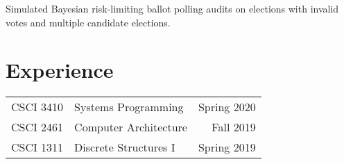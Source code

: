 \documentclass[]{deedy-resume-openfont}
\begin{document}
\begin{minipage}[t]{0.66\textwidth}
        \sectionsep
        Simulated Bayesian risk-limiting ballot polling audits on elections with invalid votes and multiple candidate elections.


        \section{Experience}
        \vspace{\topsep} %
        \begin{tabular}{rlr}
                CSCI 3410 & Systems Programming   & Spring 2020\\
                CSCI 2461 & Computer Architecture & Fall 2019 \\
                CSCI 1311 & Discrete Structures I & Spring 2019 \\
        \end{tabular}
        \sectionsep



\end{minipage}
\end{document}
